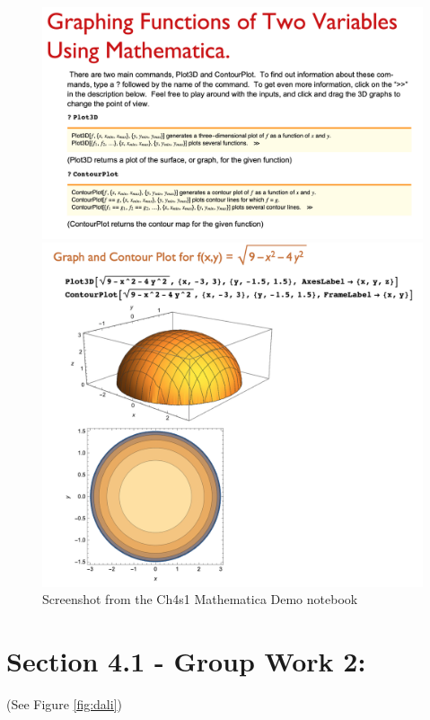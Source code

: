 \begin{figure}[!hp]

\includegraphics[width=.8\textwidth]{Mathematica-Demo1.png}

\includegraphics[width=.8\textwidth]{Mathematica-Demo2.png}
\caption{Screenshot from the Ch4s1 Mathematica Demo notebook}
\label{fig:Ch4s1demo}

\end{figure}


\section*{Section 4.1 - Group Work 2:}
(See Figure \ref{fig:dali})

